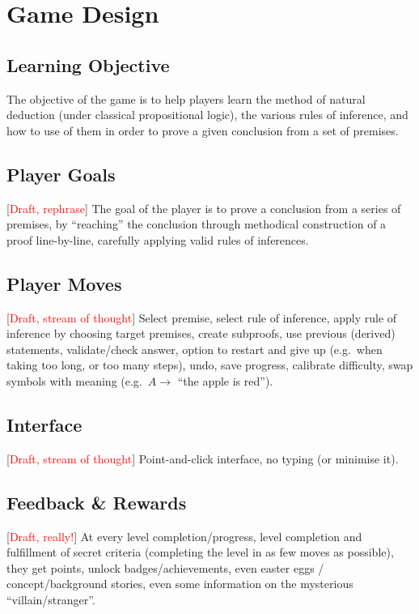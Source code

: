 \documentclass[a4paper]{article}
\newcommand{\comment}[1]{[\textcolor{red}{#1}]} %
\begin{document}
\section{Game Design}

\subsection{Learning Objective}
The objective of the game is to help players learn the method of natural deduction (under classical propositional logic), the various rules of inference, and how to use of them in order to prove a given conclusion from a set of premises.

\subsection{Player Goals}
\comment{Draft, rephrase} The goal of the player is to prove a conclusion from a series of premises, by ``reaching'' the conclusion through methodical construction of a proof line-by-line, carefully applying valid rules of inferences.

\subsection{Player Moves}
\comment{Draft, stream of thought} Select premise, select rule of inference, apply rule of inference by choosing target premises, create subproofs, use previous (derived) statements, validate/check answer, option to restart and give up (e.g.\ when taking too long, or too many steps), undo, save progress, calibrate difficulty, swap symbols with meaning (e.g.\ $A \rightarrow$ ``the apple is red'').

\subsection{Interface}
\comment{Draft, stream of thought} Point-and-click interface, no typing (or minimise it).

\subsection{Feedback \& Rewards}
\comment{Draft, really!} At every level completion/progress, level completion and fulfillment of secret criteria (completing the level in as few moves as possible), they get points, unlock badges/achievements, even easter eggs / concept/background stories, even some information on the mysterious ``villain/stranger''.
\end{document}

